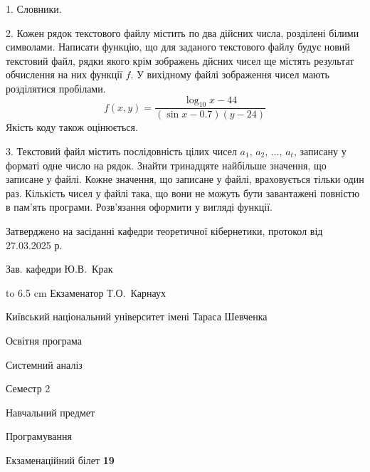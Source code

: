 \documentclass[12pt, ukrainian]{article}
\begin{document}
{%
1. Словники.%
\par
\vspace{2mm}

2. Кожен рядок текстового файлу містить по два дійсних числа, розділені білими символами.
Написати функцію, що для заданого текстового файлу будує новий текстовий файл, рядки якого крім зображень дйсних чисел ще містять результат обчислення на них функції $f$. У вихідному файлі зображення чисел мають розділятися пробілами. 
$$f(x, y) =\frac{\log_{10} x - 44}{(\sin x - 0.7) (y - 24)}$$ 
Якість коду також оцінюється.

\par
\vspace{2mm}

3. Текстовий файл містить послідовність цілих чисел $a_1$, $a_2$, $\ldots$, $a_t$, записану у форматі одне число на рядок. Знайти тринадцяте найбільше значення, що записане у файлі. Кожне значення, що записане у файлі, враховується тільки один раз. Кількість чисел у файлі така, що вони не можуть бути завантажені повністю в пам'ять програми. Розв'язання оформити у вигляді функції.

}
{\smallskip\smallskip \begin {scriptsize} Затверджено на засіданні кафедри теоретичної кібернетики, протокол   від   27.03.2025 р.\par\smallskip\smallskip\smallskip\smallskip
{\parbox {6.5 cm} {Зав. кафедри \dotfill Ю.В.~Крак}}\hspace {0.7cm} {\hbox to 6.5 cm { Екзаменатор \dotfill Т.О.~Карнаух}} \end{scriptsize}}
\newpage
{{\begin {scriptsize}\par
{ \center  Київський національний університет імені Тараса Шевченка \par}
{\parbox {5 cm}{Освітня програма \hfill}{\parbox {7 cm}{Системний аналіз\hfill}}\parbox {6 cm}{\hfill Семестр 2}}\par
{\parbox {5 cm} {Навчальний предмет \hfill}\parbox {7 cm}{Програмування \hfill}\parbox {6cm}{\hfill}\par}\vspace{-15pt} \end{scriptsize}}{\center Екзаменаційний білет \No \textbf { 19 }\par}}
\end{document}
